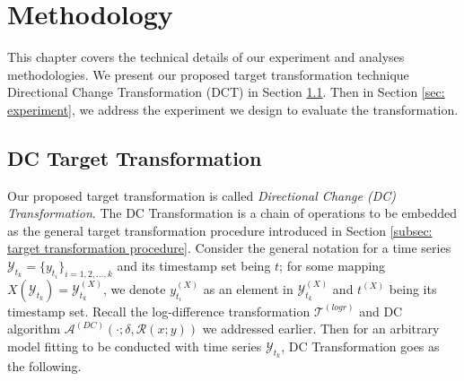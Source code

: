 \chapter{Methodology}\label{ch: methodology}
This chapter covers the technical details of our experiment and analyses methodologies. We present our proposed target transformation technique Directional Change Transformation (DCT) in Section \ref{sec: dc transformation}. Then in Section \ref{sec: experiment}, we address the experiment we design to evaluate the transformation.

\section{DC Target Transformation}\label{sec: dc transformation}
Our proposed target transformation is called \textit{Directional Change (DC) Transformation}. The DC Transformation is a chain of operations to be embedded as the general target transformation procedure introduced in Section \ref{subsec: target transformation procedure}. Consider the general notation for a time series $\mathcal{Y}_{t_k} = \{y_{t_i}\}_{i = 1, 2, \ldots, k}$ and its timestamp set being $t$; for some mapping $X (\mathcal{Y}_{t_k}) = \mathcal{Y}^{(X)}_{t_k}$, we denote $y^{(X)}_{t_i}$ as an element in $\mathcal{Y}^{(X)}_{t_k}$ and $t^{(X)}$ being its timestamp set. Recall the log-difference transformation $\mathcal{T}^{(logr)}$ and DC algorithm $\mathcal{A}^{(DC)} (\cdot; \delta, \mathcal{R} (x; y))$ we addressed earlier. Then for an arbitrary model fitting to be conducted with time series $\mathcal{Y}_{t_k}$, DC Transformation goes as the following.

